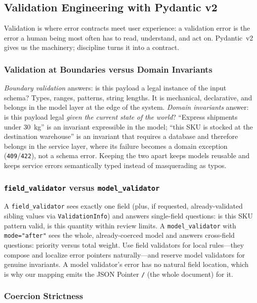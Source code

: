 \subsection{Validation Engineering with Pydantic v2}

Validation is where error contracts meet user experience: a validation error
is the error a human being most often has to read, understand, and act on.
Pydantic~v2 \cite{pydanticdocs} gives us the machinery; discipline turns it
into a contract.

\subsubsection{Validation at Boundaries versus Domain Invariants}

\emph{Boundary validation} answers: is this payload a legal instance of the
input schema? Types, ranges, patterns, string lengths. It is mechanical,
declarative, and belongs in the model layer at the edge of the system.
\emph{Domain invariants} answer: is this payload legal \emph{given the
current state of the world}? ``Express shipments under 30~kg'' is an
invariant expressible in the model; ``this SKU is stocked at the destination
warehouse'' is an invariant that requires a database and therefore belongs
in the service layer, where its failure becomes a domain exception
(\texttt{409}/\texttt{422}), not a schema error. Keeping the two apart keeps
models reusable and keeps service errors semantically typed instead of
masquerading as typos.

\subsubsection{\texttt{field\_validator} versus \texttt{model\_validator}}

A \texttt{field\_validator} sees exactly one field (plus, if requested,
already-validated sibling values via \texttt{ValidationInfo}) and answers
single-field questions: is this SKU pattern valid, is this quantity within
review limits. A \texttt{model\_validator} with \texttt{mode="after"} sees
the whole, already-coerced model and answers cross-field questions: priority
versus total weight. Use field validators for local rules---they compose and
localize error pointers naturally---and reserve model validators for genuine
invariants. A model validator's error has no natural field location, which is
why our mapping emits the JSON Pointer \texttt{/} (the whole document) for
it.

\subsubsection{Coercion Strictness}

